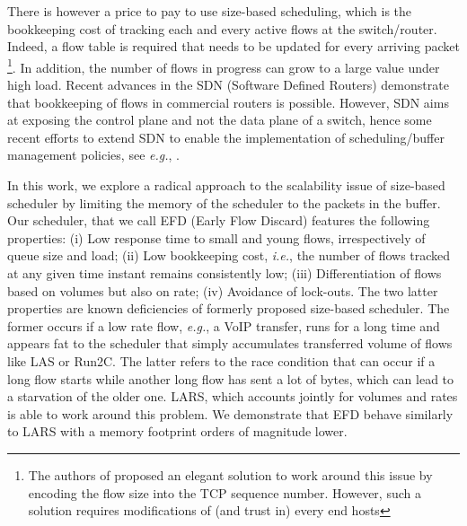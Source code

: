 \documentclass[preprint,12pt]{elsarticle}
\begin{document}
There is however a price to pay to use size-based scheduling, which is the bookkeeping cost of tracking each and every active flows at the switch/router. %
Indeed, a flow table is required that needs to be updated for every arriving packet \footnote{The authors of \cite{Avrachenkov04Run2c} proposed an elegant solution to work around this issue by encoding the flow size into the TCP sequence number. However, such a solution requires modifications of (and trust in) every end hosts}. %
In addition, the number of flows in progress can grow to a large value under high load. 
Recent advances in the SDN (Software Defined Routers) demonstrate that bookkeeping of flows in commercial routers is possible. However, SDN aims at exposing the control plane and not the data plane of a switch, hence some recent efforts to extend SDN to enable the implementation of scheduling/buffer management policies, see \textit{e.g.}, \cite{sivaraman2013no}.

In this work, we explore a radical approach to the scalability issue of size-based scheduler by limiting the memory of the scheduler to the packets in the buffer. Our scheduler, that we call  EFD (Early Flow Discard) features the following properties: (i) Low response time to small and young flows, irrespectively of queue size and load; (ii) Low bookkeeping cost, \textit{\textit{i.e.}}, the number of flows tracked at any given time instant remains consistently low; (iii) Differentiation of flows based on volumes but also on rate; (iv) Avoidance of lock-outs. The two latter properties are known deficiencies of formerly proposed size-based scheduler. The former occurs if a low rate flow, \textit{e.g.}, a VoIP transfer, runs for a long time and appears fat to the scheduler that simply accumulates transferred volume of flows like LAS or Run2C. The latter refers to the race condition that can occur if a long flow starts while another long flow has sent a lot of bytes, which can lead to a starvation of the older one. LARS, which accounts jointly for volumes and rates is able to work around this problem. We demonstrate that EFD behave similarly to LARS with a memory footprint orders of magnitude lower.%
\end{document}
